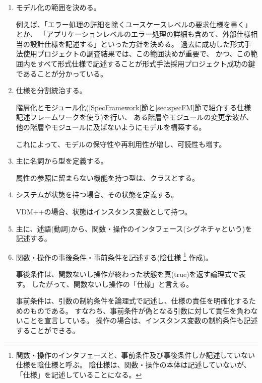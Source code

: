 \begin{enumerate}
\item モデル化の範囲を決める。

	例えば、「エラー処理の詳細を除くユースケースレベルの要求仕様を書く」とか、
	「アプリケーションレベルのエラー処理の詳細も含めて、外部仕様相当の設計仕様を記述する」といった方針を決める。
	過去に成功した形式手法使用プロジェクトの調査結果\cite{SEC2012FMREPORT}では、この範囲決めが重要で、
	かつ、この範囲内をすべて形式仕様で記述することが形式手法採用プロジェクト成功の鍵であることが分かっている。

\item 仕様を分割統治する。

	階層化とモジュール化(\ref{SpecFramework}節と\ref{sec:specFM}節で紹介する仕様記述フレームワークを使う)を行い、
	ある階層やモジュールの変更余波が、他の階層やモジュールに及ばないようにモデルを構築する。

	これによって、モデルの保守性や再利用性が増し、可読性も増す。

\item 主に名詞から型を定義する。

	属性の参照に留まらない機能を持つ型は、クラスとする。

\item システムが状態を持つ場合、その状態を定義する。

	VDM++の場合、状態はインスタンス変数として持つ。

\item 主に、述語(動詞)から、関数・操作のインタフェース(シグネチャという)を記述する。

\item 関数・操作の事後条件・事前条件を記述する(陰仕様
		\footnote{関数・操作のインタフェースと、事前条件及び事後条件しか記述していない仕様を陰仕様と呼ぶ。
		陰仕様は、関数・操作の本体は記述していないが、「仕様」を記述していることになる。}
	作成)。

	事後条件は、関数ないし操作が終わった状態を真(true)を返す論理式で表す。
	したがって、関数ないし操作の「仕様」と言える。

	事前条件は、引数の制約条件を論理式で記述し、仕様の責任を明確化するためのものである。
	すなわち、事前条件が偽となる引数に対して責任を負わないことを宣言している。
	操作の場合は、インスタンス変数の制約条件も記述することができる。


\end{enumerate}
